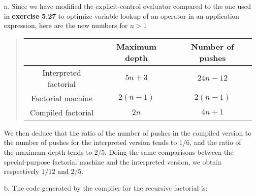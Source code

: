 \documentclass[a4paper,12pt]{article}
\newcommand{\subpar}[1]{\medskip \noindent #1.}
\begin{document}
\subpar{a} Since we have modified the explicit-control evaluator
compared to the one used in \textbf{exercise 5.27} to optimize
variable lookup of an operator in an application expression, here are
the new numbers for $n > 1$

\begin{quote}
  \begin{tabular}{|c|c|c|}
    \hline &Maximum depth& Number of pushes \\
    \hline Interpreted factorial & $5 n + 3$ & $24 n - 12$ \\
    \hline Factorial machine & $2(n-1)$ & $2(n-1)$ \\
    \hline Compiled factorial & $2n$ & $4n+1$ \\
    \hline
  \end{tabular}
\end{quote}

We then deduce that the ratio of the number of pushes in the compiled
version to the number of pushes for the interpreted version tends to
$1/6$, and the ratio of the maximum depth tends to $2/5$.  Doing the
same comparisons between the special-purpose factorial machine and the
interpreted version, we obtain respectively $1/12$ and $2/5$.

\subpar{b} The code generated by the compiler for the recursive
factorial is:
\end{document}
